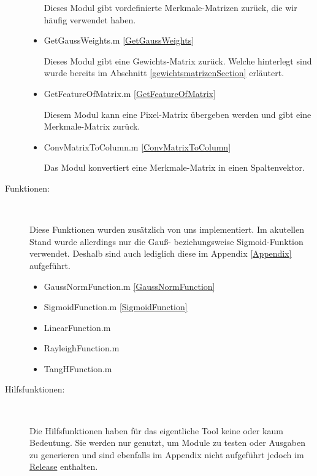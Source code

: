 \begin{description}
\begin{itemize}
		Dieses Modul gibt vordefinierte Merkmale-Matrizen zurück, die wir häufig verwendet haben. 
		
		\item GetGaussWeights.m \ref{GetGaussWeights}  
		
		Dieses Modul gibt eine Gewichts-Matrix zurück. Welche hinterlegt sind wurde bereits im Abschnitt \ref{gewichtsmatrizenSection} erläutert. 
		
		\item GetFeatureOfMatrix.m \ref{GetFeatureOfMatrix}  
		
		Diesem Modul kann eine Pixel-Matrix übergeben werden und gibt eine Merkmale-Matrix zurück. 
		
		\item ConvMatrixToColumn.m \ref{ConvMatrixToColumn}  
		
		Das Modul konvertiert eine Merkmale-Matrix in einen Spaltenvektor. 
		
	\end{itemize}
	
	\item[Funktionen:]~\par
	
	Diese Funktionen wurden zusätzlich von uns implementiert. Im akutellen Stand wurde allerdings nur die Gauß- beziehungsweise Sigmoid-Funktion verwendet. Deshalb sind auch lediglich diese im Appendix \ref{Appendix} aufgeführt.
	
	\begin{itemize}
		\item GaussNormFunction.m \ref{GaussNormFunction}
		\item SigmoidFunction.m \ref{SigmoidFunction}
		\item LinearFunction.m
		\item RayleighFunction.m
		\item TangHFunction.m
	\end{itemize}
\newpage
	\item[Hilfsfunktionen:]~\par
	
	Die Hilfsfunktionen haben für das eigentliche Tool keine oder kaum Bedeutung. Sie werden nur genutzt, um Module zu testen oder Ausgaben zu generieren und sind ebenfalls im Appendix nicht aufgeführt jedoch im \href{https://github.com/TonightsCoding/MachineLearning/releases/tag/v1.0.0}{Release} enthalten.
	

\end{description}
